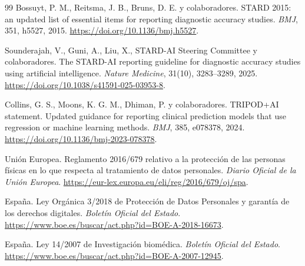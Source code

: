 \begin{thebibliography}{99}
Bossuyt, P. M., Reitsma, J. B., Bruns, D. E. y colaboradores.
\newblock STARD 2015: an updated list of essential items for reporting diagnostic accuracy studies.
\newblock \emph{BMJ}, 351, h5527, 2015.
\newblock \url{https://doi.org/10.1136/bmj.h5527}.

Sounderajah, V., Guni, A., Liu, X., STARD-AI Steering Committee y colaboradores.
\newblock The STARD-AI reporting guideline for diagnostic accuracy studies using artificial intelligence.
\newblock \emph{Nature Medicine}, 31(10), 3283--3289, 2025.
\newblock \url{https://doi.org/10.1038/s41591-025-03953-8}.

Collins, G. S., Moons, K. G. M., Dhiman, P. y colaboradores.
\newblock TRIPOD+AI statement. Updated guidance for reporting clinical prediction models that use regression or machine learning methods.
\newblock \emph{BMJ}, 385, e078378, 2024.
\newblock \url{https://doi.org/10.1136/bmj-2023-078378}.

Unión Europea.
\newblock Reglamento 2016/679 relativo a la protección de las personas físicas en lo que respecta al tratamiento de datos personales.
\newblock \emph{Diario Oficial de la Unión Europea}.
\newblock \url{https://eur-lex.europa.eu/eli/reg/2016/679/oj/spa}.

España.
\newblock Ley Orgánica 3/2018 de Protección de Datos Personales y garantía de los derechos digitales.
\newblock \emph{Boletín Oficial del Estado}.
\newblock \url{https://www.boe.es/buscar/act.php?id=BOE-A-2018-16673}.

España.
\newblock Ley 14/2007 de Investigación biomédica.
\newblock \emph{Boletín Oficial del Estado}.
\newblock \url{https://www.boe.es/buscar/act.php?id=BOE-A-2007-12945}.

\end{thebibliography}
